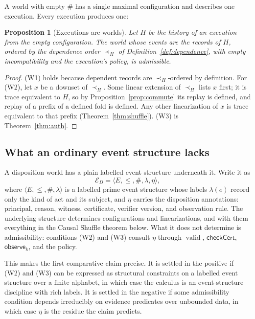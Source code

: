 \documentclass[11pt,openany]{book}
\newtheorem{proposition}[theorem]{Proposition}
\theoremstyle{remark}
\newcommand{\valid}{\operatorname{valid}}
\begin{document}
A world with empty $\#$ has a single maximal configuration and describes
one execution. Every execution produces one:

\begin{proposition}[Executions are worlds]\label{prop:exec-world}
Let $H$ be the history of an execution from the empty configuration. The
world whose events are the records of $H$, ordered by the dependence order
$\prec_H$ of Definition~\ref{def:dependence}, with empty incompatibility
and the execution's policy, is admissible.
\end{proposition}

\begin{proof}
(W1) holds because dependent records are $\prec_H$-ordered by definition.
For (W2), let $x$ be a downset of $\prec_H$. Some linear extension of
$\prec_H$ lists $x$ first; it is trace equivalent to $H$, so by
Proposition~\ref{prop:commute} its replay is defined, and replay of a
prefix of a defined fold is defined. Any other linearization of $x$ is
trace equivalent to that prefix (Theorem~\ref{thm:shuffle}). (W3) is
Theorem~\ref{thm:auth}.
\end{proof}

\subsection*{What an ordinary event structure lacks}

A disposition world has a plain labelled event structure underneath it.
Write it as
\[
\mathcal E_D=\langle E,\le,\#,\lambda,\eta\rangle,
\]
where $\langle E,\le,\#,\lambda\rangle$ is a labelled prime event
structure whose labels $\lambda(e)$ record only the kind of act and its
subject, and $\eta$ carries the disposition annotations: principal,
reason, witness, certificate, verifier version, and observation rule. The
underlying structure determines configurations and linearizations, and
with them everything in the Causal Shuffle theorem below. What it does not
determine is admissibility: conditions (W2) and (W3) consult $\eta$ through
$\valid$, $\mathsf{checkCert}$, $\mathsf{observe}_k$, and the policy.

This makes the first comparative claim precise. It is settled in the
positive if (W2) and (W3) can be expressed as structural constraints on a
labelled event structure over a finite alphabet, in which case the
calculus is an event-structure discipline with rich labels. It is settled
in the negative if some admissibility condition depends irreducibly on
evidence predicates over unbounded data, in which case $\eta$ is the
residue the claim predicts.
\end{document}
